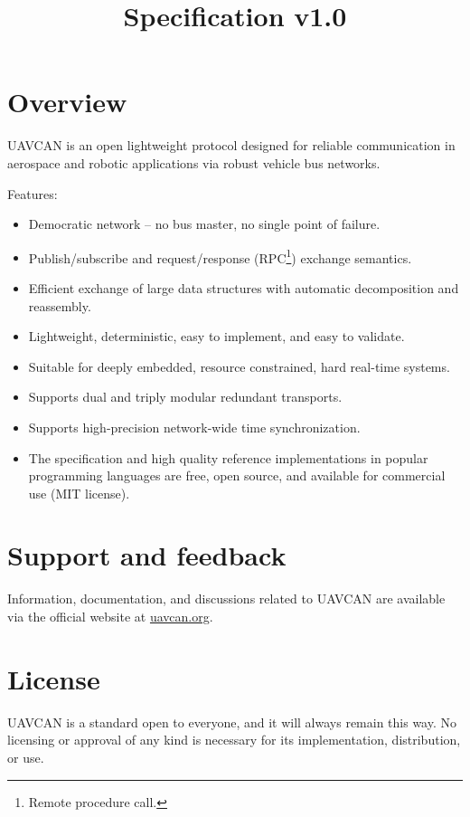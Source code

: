 \documentclass{uavcandoc}
\title{Specification v1.0}
\begin{document}
\frontmatter

\begin{titlepage}

\section*{Overview}

UAVCAN is an open lightweight protocol designed for reliable communication in aerospace and robotic applications via
robust vehicle bus networks.

Features:

\begin{itemize}
    \item Democratic network -- no bus master, no single point of failure.
    \item Publish/subscribe and request/response (RPC\footnote{Remote procedure call.}) exchange semantics.
    \item Efficient exchange of large data structures with automatic decomposition and reassembly.
    \item Lightweight, deterministic, easy to implement, and easy to validate.
    \item Suitable for deeply embedded, resource constrained, hard real-time systems.
    \item Supports dual and triply modular redundant transports.
    \item Supports high-precision network-wide time synchronization.
    \item The specification and high quality reference implementations in popular programming languages are free,
    open source, and available for commercial use (MIT license).
\end{itemize}

\section*{Support and feedback}

Information, documentation, and discussions related to UAVCAN are available via the official website at
\href{http://uavcan.org}{uavcan.org}.

\BeginRightColumn

\section*{License}

UAVCAN is a standard open to everyone, and it will always remain this way.
No licensing or approval of any kind is necessary for its implementation, distribution, or use.


\end{titlepage}
\end{document}
